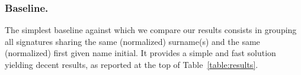 \documentclass[runningheads,a4paper]{llncs}
\newcommand{\longpage}{\enlargethispage{\baselineskip}}
\begin{document}

\longpage

\subsubsection{Baseline.} The simplest baseline against which we compare our results
consists in grouping all signatures sharing the same (normalized) surname(s) and
the same (normalized) first given name initial. It provides a simple and fast
solution yielding decent results, as reported at the top of
Table~\ref{table:results}.
\end{document}
